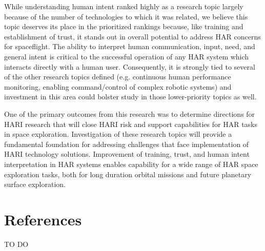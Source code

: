 While understanding human intent ranked highly as a research topic largely because of the number of technologies to which it was related, we believe this topic deserves its place in the prioritized rankings because, like training and establishment of trust, it stands out in overall potential to address HAR concerns for spaceflight. The ability to interpret human communication, input, need, and general intent is critical to the successful operation of any HAR system which interacts directly with a human user. Consequently, it is strongly tied to several of the other research topics defined (e.g. continuous human performance monitoring, enabling command/control of complex robotic systems) and investment in this area could bolster study in those lower-priority topics as well.

One of the primary outcomes from this research was to determine directions for HARI research that will close HARI risk and support capabilities for HAR tasks in space exploration. Investigation of these research topics will provide a fundamental foundation for addressing challenges that face implementation of HARI technology solutions. Improvement of training, trust, and human intent interpretation in HAR systems enables capability for a wide range of HAR space exploration tasks, both for long duration orbital missions and future planetary surface exploration.

\section{References}

TO DO

